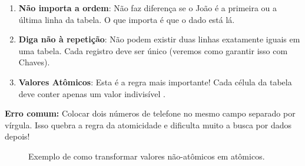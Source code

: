 \begin{enumerate}
    \item \textbf{Não importa a ordem}: Não faz diferença se o João é a primeira ou a última linha da tabela. O que importa é que o dado está lá.
    \item \textbf{Diga não à repetição}: Não podem existir duas linhas exatamente iguais em uma tabela. Cada registro deve ser único (veremos como garantir isso com Chaves).
    \item \textbf{Valores Atômicos}: Esta é a regra mais importante! Cada célula da tabela deve conter apenas um valor indivisível .
\end{enumerate}

\begin{danger}
\textbf{Erro comum:} Colocar dois números de telefone no mesmo campo separado por vírgula. Isso quebra a regra da atomicidade e dificulta muito a busca por dados depois!
\end{danger}

\begin{figure}[H]
    \centering
    \caption{Exemplo de como transformar valores não-atômicos em atômicos.}
\end{figure}

